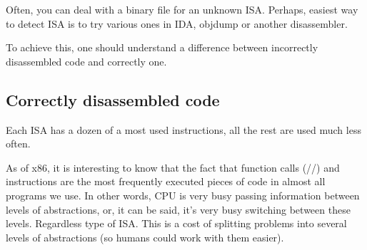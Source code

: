 \label{ISA_detect}

Often, you can deal with a binary file for an unknown \ac{ISA}.
Perhaps, easiest way to detect \ac{ISA} is to try various ones in IDA, objdump or another disassembler.

To achieve this, one should understand a difference between incorrectly disassembled code and correctly one.

\renewcommand{\CURPATH}{digging_into_code/incorrect_disassembly}


\subsection{Correctly disassembled code}
\label{correctly_disasmed_code}

Each \ac{ISA} has a dozen of a most used instructions, all the rest are used much less often.

As of x86, it is interesting to know that the fact that function calls (\PUSH/\CALL/\ADD) and \MOV
instructions are the most frequently executed pieces of code in almost all
programs we use.
In other words, \ac{CPU} is very busy passing information between levels of abstractions, or,
it can be said, it's very busy switching between these levels.
Regardless type of \ac{ISA}.
This is a cost of splitting problems into several levels of abstractions (so humans could work with them easier).

